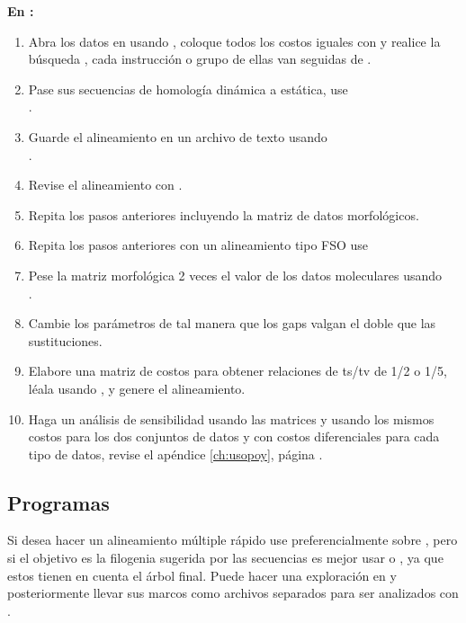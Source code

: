 \textbf{En :}
\begin{enumerate}
\item Abra los datos en  usando , coloque todos los costos iguales con  y realice la b\'usqueda    , cada instrucci\'on o grupo de ellas van seguidas de .
\item Pase sus secuencias de homolog\'ia din\'amica a est\'atica, use \\ .
\item Guarde el alineamiento en un archivo de texto usando \\ .
\item Revise el alineamiento con .
\item Repita los pasos anteriores incluyendo la matriz de datos morfol\'ogicos.
\item Repita los pasos anteriores con un alineamiento tipo FSO use \\ 
\item Pese la matriz morfol\'ogica 2 veces el valor de los datos moleculares usando \\ .
\item Cambie los par\'ametros de tal manera que los gaps valgan el doble que las sustituciones.
\item Elabore una matriz de costos para obtener relaciones de ts/tv de  1/2 o  1/5, l\'eala usando , y genere el alineamiento.
\item Haga un an\'alisis de sensibilidad usando las matrices  y  usando los mismos costos para los dos conjuntos de datos y con costos diferenciales para cada tipo de datos, revise el ap\'endice \ref{ch:usopoy}, p\'agina \pageref{ch:usopoy}. 
\end{enumerate}

\subsection{Programas}
Si desea hacer un alineamiento m\'ultiple r\'apido use preferencialmente  sobre , pero si el objetivo es la filogenia sugerida por las secuencias es mejor usar  o , ya que estos tienen en cuenta el \'arbol final. Puede hacer una  exploraci\'on en  y posteriormente llevar sus marcos como archivos separados para ser analizados con .

